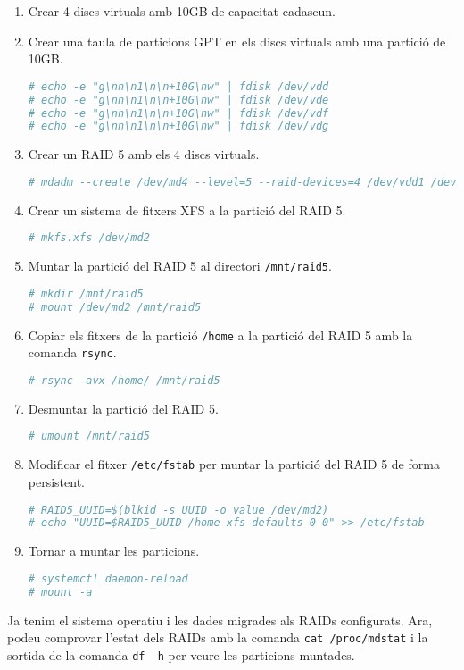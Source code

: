 \begin{enumerate}
        \item Crear 4 discs virtuals amb 10GB de capacitat cadascun.
        \item Crear una taula de particions GPT en els discs virtuals amb una partició de 10GB.
\begin{lstlisting}[language=bash, numbers=none, commentstyle=\color{black}]
# echo -e "g\nn\n1\n\n+10G\nw" | fdisk /dev/vdd
# echo -e "g\nn\n1\n\n+10G\nw" | fdisk /dev/vde
# echo -e "g\nn\n1\n\n+10G\nw" | fdisk /dev/vdf
# echo -e "g\nn\n1\n\n+10G\nw" | fdisk /dev/vdg
\end{lstlisting}
        \item Crear un RAID 5 amb els 4 discs virtuals.
\begin{lstlisting}[language=bash, numbers=none, commentstyle=\color{black}]
# mdadm --create /dev/md4 --level=5 --raid-devices=4 /dev/vdd1 /dev/vde1 /dev/vdf1 /dev/vdg1
\end{lstlisting}
        \item Crear un sistema de fitxers XFS a la partició del RAID 5.
\begin{lstlisting}[language=bash, numbers=none, commentstyle=\color{black}]
# mkfs.xfs /dev/md2
\end{lstlisting}
        \item Muntar la partició del RAID 5 al directori \texttt{/mnt/raid5}.
\begin{lstlisting}[language=bash, numbers=none, commentstyle=\color{black}]
# mkdir /mnt/raid5
# mount /dev/md2 /mnt/raid5
\end{lstlisting}
        \item Copiar els fitxers de la partició \texttt{/home} a la partició del RAID 5 amb la comanda \texttt{rsync}.
\begin{lstlisting}[language=bash, numbers=none, commentstyle=\color{black}]
# rsync -avx /home/ /mnt/raid5
\end{lstlisting}
        \item Desmuntar la partició del RAID 5.
\begin{lstlisting}[language=bash, numbers=none, commentstyle=\color{black}]
# umount /mnt/raid5
\end{lstlisting}
        \item Modificar el fitxer \texttt{/etc/fstab} per muntar la partició del RAID 5 de forma persistent.
\begin{lstlisting}[language=bash, numbers=none, commentstyle=\color{black}]
# RAID5_UUID=$(blkid -s UUID -o value /dev/md2)
# echo "UUID=$RAID5_UUID /home xfs defaults 0 0" >> /etc/fstab
\end{lstlisting}
        \item Tornar a muntar les particions.
\begin{lstlisting}[language=bash, numbers=none, commentstyle=\color{black}]
# systemctl daemon-reload
# mount -a
\end{lstlisting}
\end{enumerate}

Ja tenim el sistema operatiu i les dades migrades als RAIDs configurats. Ara, podeu comprovar l'estat dels RAIDs amb la comanda \texttt{cat /proc/mdstat} i la sortida de la comanda \texttt{df -h} per veure les particions muntades. 




